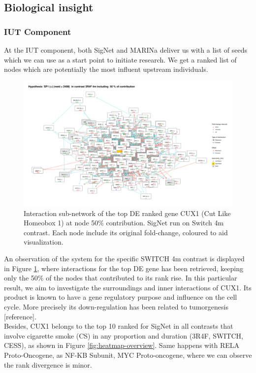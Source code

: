 \subsection{Biological insight}
\subsubsection{IUT Component}
At the IUT component, both SigNet and MARINa deliver us with a list of seeds which we can use as a start point to initiate research. We get a ranked list of nodes which are potentially the most influent upstream individuals.
\\

\begin{figure}[!h]
    \centering
    \includegraphics[width=\textwidth, height=\textheight, keepaspectratio]{Major Thesis/figures/iut/graph/3R4F4m50-SP1.png}
    \caption{Interaction sub-network of the top DE ranked gene CUX1 (Cut Like Homeobox 1) at node 50\% contribution. SigNet run on Switch 4m contrast. Each node include its original fold-change, coloured to aid visualization.}
    \label{fig:graph-expansion}
\end{figure}

An observation of the system for the specific SWITCH 4m contrast is displayed in Figure \ref{fig:graph-expansion}, where interactions for the top DE gene has been retrieved, keeping only the 50\% of the nodes that contributed to its rank rise. In this particular result, we aim to investigate the surroundings and inner interactions of CUX1. Its product is known to have a gene regulatory purpose and influence on the cell cycle. More precisely its down-regulation has been related to tumorgenesis [reference].
\\

Besides, CUX1 belongs to the top 10 ranked for SigNet in all contrasts that involve cigarette smoke (CS) in any proportion and duration (3R4F, SWITCH, CESS), as shown in Figure \ref{fig:heatmap-overview}. Same happens with RELA Proto-Oncogene, as NF-KB Subunit, MYC Proto-oncogene, where we can observe the rank divergence is minor.
\\

